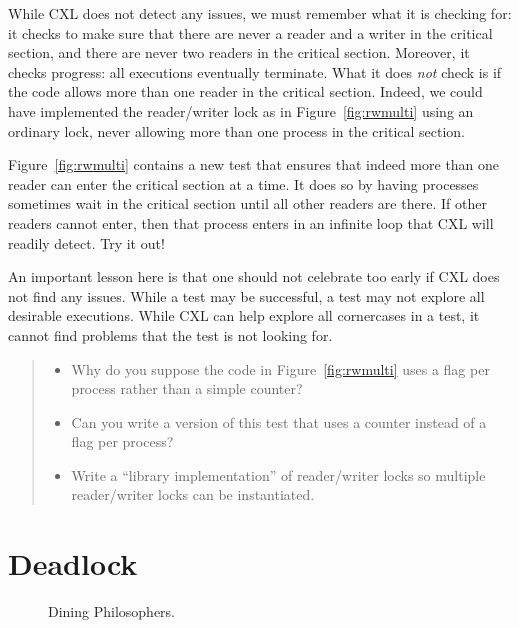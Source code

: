 \documentclass{report}
\newenvironment{code}{
\tcolorbox
}{
\endtcolorbox
}
\begin{document}
While CXL does not detect any issues, we must remember what it is checking
for: it checks to make sure that there are never a reader and a writer
in the critical section, and there are never two readers in the critical
section.  Moreover, it checks progress: all executions eventually terminate.
What it does \emph{not} check is if the code allows more than one reader
in the critical section.  Indeed, we could have implemented the reader/writer
lock as in Figure~\ref{fig:rwmulti} using an ordinary lock, never allowing
more than one process in the critical section.

Figure~\ref{fig:rwmulti} contains a new test that ensures that indeed more
than one reader can enter the critical section at a time.  It does so by
having processes sometimes wait in the critical section until all other readers
are there.  If other readers cannot enter, then that process enters in an
infinite loop that CXL will readily detect.  Try it out!

An important lesson here is that one should not celebrate too early if CXL
does not find any issues.  While a test may be successful, a test may not
explore all desirable executions.  While CXL can help explore all cornercases
in a test, it cannot find problems that the test is not looking for.

\begin{quote}
\begin{itemize}
\item Why do you suppose the code in Figure~\ref{fig:rwmulti} uses a flag
per process rather than a simple counter?
\item Can you write a version of this test that uses a counter instead
of a flag per process?
\item Write a ``library implementation'' of reader/writer locks so multiple
reader/writer locks can be instantiated.
\end{itemize}
\end{quote}

\chapter{Deadlock}

\begin{figure}
\begin{code}
\end{code}
\caption{Dining Philosophers.}
\label{fig:diners}
\end{figure}
\end{document}
